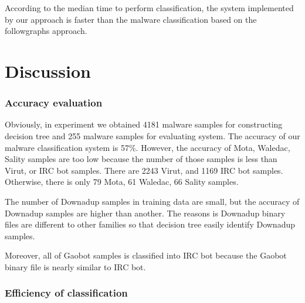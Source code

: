 According to the median time to perform classification, the system implemented by our approach is faster than the malware classification based on the followgraphs approach.
\section{Discussion}
\subsubsection{Accuracy evaluation}
Obviously, in experiment we obtained 4181 malware samples for constructing decision tree and 255 malware samples for evaluating system. The accuracy of our malware classification system is 57\%. However, the accuracy of Mota, Waledac, Sality samples are too low because the number of those samples is less than Virut, or IRC bot samples. There are 2243 Virut, and 1169 IRC bot samples. Otherwise, there is only 79 Mota, 61 Waledac, 66 Sality samples.

The number of Downadup samples in training data are small, but the accuracy of Downadup samples are higher than another. The reasons is Downadup binary files are different to other families so that decision tree easily identify Downadup samples.  

Moreover, all of Gaobot samples is classified into IRC bot because the Gaobot binary file is nearly similar to IRC bot.

\subsubsection{Efficiency  of classification}


